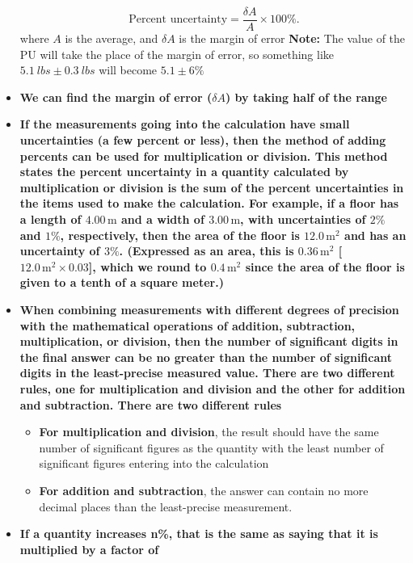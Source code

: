\documentclass{report}
\begin{document}
\begin{itemize}
            \[
                \text{Percent uncertainty} = \frac{\delta A}{A} \times 100\%.
            \]
            where $A$ is the average, and $\delta A$ is the margin of error
            \bigbreak \noindent 
            \textbf{Note:} The value of the PU will take the place of the margin of error, so something like $5.1\ lbs \pm 0.3\ lbs $ will become $5.1 \pm 6 \% $
        \item \textbf{We can find the margin of error ($\delta A$) by taking half of the range}
        \item \textbf{If the measurements going into the calculation have small uncertainties (a few percent or less), then the method of adding percents can be used for multiplication or division. This method states the percent uncertainty in a quantity calculated by multiplication or division is the sum of the percent uncertainties in the items used to make the calculation. For example, if a floor has a length of \(4.00 \, \text{m}\) and a width of \(3.00 \, \text{m}\), with uncertainties of \(2\%\) and \(1\%\), respectively, then the area of the floor is \(12.0 \, \text{m}^2\) and has an uncertainty of \(3\%\). (Expressed as an area, this is \(0.36 \, \text{m}^2\) [\(12.0 \, \text{m}^2 \times 0.03\)], which we round to \(0.4 \, \text{m}^2\) since the area of the floor is given to a tenth of a square meter.)}
        \item \textbf{    When combining measurements with different degrees of precision with the mathematical operations of addition, subtraction, multiplication, or division, then the number of significant digits in the final answer can be no greater than the number of significant digits in the least-precise measured value. There are two different rules, one for multiplication and division and the other for addition and subtraction. There are two different rules}
            \begin{itemize}
                \item \textbf{For multiplication and division}, the result should have the same number of significant figures as the quantity with the least number of significant figures entering into the calculation 
                \item \textbf{For addition and subtraction}, the answer can contain no more decimal places than the least-precise measurement.
            \end{itemize}
        \item \textbf{If a quantity increases n\%, that is the same as saying that it is multiplied by a factor of}

\end{itemize}
\end{document}
